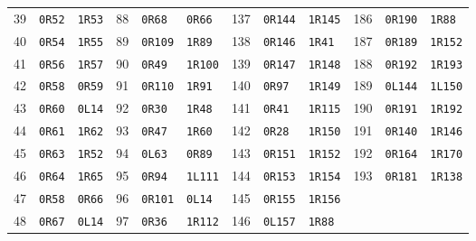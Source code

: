 \begin{center}
\begin{tabular}{rll@{\qquad}rll@{\qquad}rll@{\qquad}rll}
39 & \texttt{0R52} & \texttt{1R53} & 88 & \texttt{0R68} & \texttt{0R66} & 137 & \texttt{0R144} & \texttt{1R145} & 186 & \texttt{0R190} & \texttt{1R88}\\
40 & \texttt{0R54} & \texttt{1R55} & 89 & \texttt{0R109} & \texttt{1R89} & 138 & \texttt{0R146} & \texttt{1R41} & 187 & \texttt{0R189} & \texttt{1R152}\\
41 & \texttt{0R56} & \texttt{1R57} & 90 & \texttt{0R49} & \texttt{1R100} & 139 & \texttt{0R147} & \texttt{1R148} & 188 & \texttt{0R192} & \texttt{1R193}\\
42 & \texttt{0R58} & \texttt{0R59} & 91 & \texttt{0R110} & \texttt{1R91} & 140 & \texttt{0R97} & \texttt{1R149} & 189 & \texttt{0L144} & \texttt{1L150}\\
43 & \texttt{0R60} & \texttt{0L14} & 92 & \texttt{0R30} & \texttt{1R48} & 141 & \texttt{0R41} & \texttt{1R115} & 190 & \texttt{0R191} & \texttt{1R192}\\
44 & \texttt{0R61} & \texttt{1R62} & 93 & \texttt{0R47} & \texttt{1R60} & 142 & \texttt{0R28} & \texttt{1R150} & 191 & \texttt{0R140} & \texttt{1R146}\\
45 & \texttt{0R63} & \texttt{1R52} & 94 & \texttt{0L63} & \texttt{0R89} & 143 & \texttt{0R151} & \texttt{1R152} & 192 & \texttt{0R164} & \texttt{1R170}\\
46 & \texttt{0R64} & \texttt{1R65} & 95 & \texttt{0R94} & \texttt{1L111} & 144 & \texttt{0R153} & \texttt{1R154} & 193 & \texttt{0R181} & \texttt{1R138}\\
47 & \texttt{0R58} & \texttt{0R66} & 96 & \texttt{0R101} & \texttt{0L14} & 145 & \texttt{0R155} & \texttt{1R156} &  &  & \\
48 & \texttt{0R67} & \texttt{0L14} & 97 & \texttt{0R36} & \texttt{1R112} & 146 & \texttt{0L157} & \texttt{1R88} &  &  & \\
\bottomrule
\end{tabular}
\end{center}
